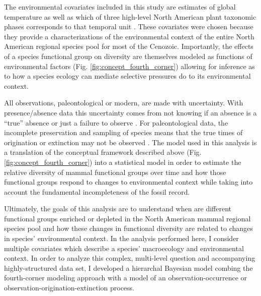 \documentclass[12pt,letterpaper]{article}
\begin{document}
The environmental covariates included in this study are estimates of global temperature as well as which of three high-level North American plant taxonomic phases corresponds to that temporal unit \citep{Cramer2011,Graham2011a}. These covariates were chosen because they provide a characterizations of the environmental context of the entire North American regional species pool for most of the Cenozoic. Importantly, the effects of a species functional group on diversity are themselves modeled as functions of environmental factors (Fig. \ref{fig:concept_fourth_corner}) allowing for inference as to how a species ecology can mediate selective pressures do to its environmental context. 

All observations, paleontological or modern, are made with uncertainty. With presence/absence data this uncertainty comes from not knowing if an absence is a ``true'' absence or just a failure to observe \citep{Royle2008,Royle2005,Foote1999a,Foote2001,Lloyd2011,Wang2016b}. For paleontological data, the incomplete preservation and sampling of species means that the true times of origination or extinction may not be observed \citep{Foote1999a,Foote2001,Wang2015,Wang2016b}. The model used in this analysis is a translation of the conceptual framework described above (Fig. \ref{fig:concept_fourth_corner}) into a statistical model in order to estimate the relative diversity of mammal functional groups over time and how those functional groups respond to changes to environmental context while taking into account the fundamental incompleteness of the fossil record.

Ultimately, the goals of this analysis are to understand when are different functional groups enriched or depleted in the North American mammal regional species pool and how these changes in functional diversity are related to changes in species' environmental context. In the analysis performed here, I consider multiple covariates which describe a species' macroecology and environmental context. In order to analyze this complex, multi-level question and accompanying highly-structured data set, I developed a hierarchal Bayesian model combing the fourth-corner modeling approach with a model of an observation-occurrence or observation-origination-extinction process. %
\end{document}
